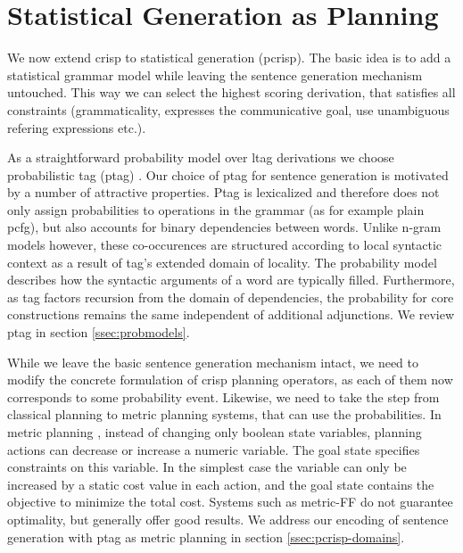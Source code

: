 \section{Statistical Generation as Planning}
\label{sec:pcrisp}

We now extend {\sc crisp} to statistical generation ({\sc pcrisp}). The basic idea is to add a statistical grammar model while leaving the sentence generation mechanism untouched. This way we can select the highest scoring derivation, that satisfies all constraints (grammaticality, expresses the communicative goal, use unambiguous refering expressions etc.). 

 As a straightforward probability model over {\sc ltag} derivations we choose probabilistic {\sc tag} ({\sc ptag}) \cite{resnik1992}.
Our choice of {\sc ptag} for sentence generation is motivated by a number of attractive properties.
 {\sc Ptag} is lexicalized and therefore does not only assign probabilities to operations in the grammar (as for example plain {\sc pcfg}), but also accounts for binary dependencies between words.  Unlike n-gram models however, these co-occurences are structured according to local syntactic context as a result of {\sc tag}'s extended domain of locality. The probability model describes how the syntactic arguments of a word are typically filled. 
Furthermore, as {\sc tag} factors recursion from the domain of dependencies, the probability for core constructions remains the same independent of additional adjunctions. 
 We review {\sc ptag} in section \ref{ssec:probmodels}.

While we leave the basic sentence generation mechanism intact, we need to modify the concrete formulation of {\sc crisp} planning operators, as each of them now corresponds to some probability event. Likewise, we need to take the step from classical planning to metric planning systems, that can use the probabilities.
In metric planning \cite{fox2002}, instead of changing only boolean state variables, planning actions can decrease or increase a numeric variable. The goal state specifies constraints on this variable. In the simplest case the variable can only be increased by a static cost value in each action, and the goal state contains the objective to minimize the total cost. Systems such as metric-{\sc FF} \cite{hoffmann2003} do not guarantee optimality, but generally offer good results. We address our encoding of sentence generation with {\sc ptag} as metric planning in section \ref{ssec:pcrisp-domains}. 

